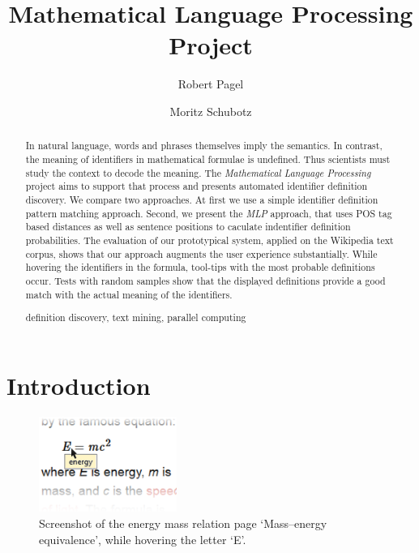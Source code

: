 \documentclass[runningheads]{llncs}
\newcommand{\keywords}[1]{\par\addvspace\baselineskip
\noindent\keywordname\enspace\ignorespaces#1}
\begin{document}
\mainmatter

\title{Mathematical Language Processing \\ Project}

\author{Robert Pagel \and Moritz Schubotz}



\maketitle


\begin{abstract}

In natural language, words and phrases themselves imply the semantics. In
contrast, the meaning of identifiers in mathematical formulae is undefined.
Thus scientists must study the context to decode the meaning. The
\emph{Mathematical Language Processing} project aims to support that process
and presents automated identifier definition discovery. We compare two
approaches. At first we use a simple identifier definition pattern matching
approach. Second, we present the \emph{MLP} approach, that uses POS tag based
distances as well as sentence positions to caculate indentifier definition
probabilities. The evaluation of our prototypical system, applied on the
Wikipedia text corpus, shows that our approach augments the user experience
substantially. While hovering the identifiers in the formula, tool-tips with
the most probable definitions occur. Tests with random samples show that the
displayed definitions provide a good match with the actual meaning of the
identifiers.

\keywords{definition discovery, text mining, parallel computing}
\end{abstract}


\section{Introduction}

\begin{figure}
\label{fig:screenshot}
\vspace{-20pt}
	\includegraphics[width=0.4\textwidth]{screenshot}
\caption{Screenshot of the energy mass relation page `Mass–energy equivalence', while hovering the letter `E'.}
\vspace{-20pt}
\end{figure}
\end{document}
